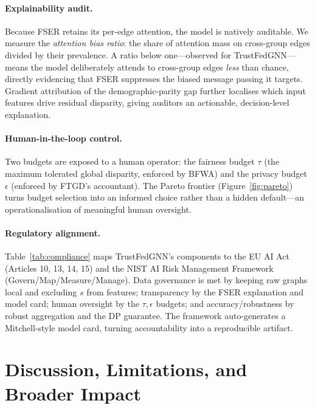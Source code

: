 \documentclass[pdflatex,sn-mathphys-num]{sn-jnl}
\theoremstyle{thmstyleone}%
\theoremstyle{thmstyletwo}%
\theoremstyle{thmstylethree}%
\begin{document}
\paragraph{Explainability audit.}
Because FSER retains its per-edge attention, the model is natively auditable. We
measure the \emph{attention bias ratio}: the share of attention mass on
cross-group edges divided by their prevalence. A ratio below one---observed for
TrustFedGNN---means the model deliberately attends to cross-group edges
\emph{less} than chance, directly evidencing that FSER suppresses the biased
message passing it targets. Gradient attribution of the demographic-parity gap
further localises which input features drive residual disparity, giving auditors
an actionable, decision-level explanation.

\paragraph{Human-in-the-loop control.}
Two budgets are exposed to a human operator: the fairness budget $\tau$ (the
maximum tolerated global disparity, enforced by BFWA) and the privacy budget
$\epsilon$ (enforced by FTGD's accountant). The Pareto frontier
(Figure~\ref{fig:pareto}) turns budget selection into an informed choice rather
than a hidden default---an operationalisation of meaningful human oversight.

\paragraph{Regulatory alignment.}
Table~\ref{tab:compliance} maps TrustFedGNN's components to the EU AI Act
(Articles 10, 13, 14, 15) and the NIST AI Risk Management Framework
(Govern/Map/Measure/Manage). Data governance is met by keeping raw graphs local
and excluding $s$ from features; transparency by the FSER explanation and model
card; human oversight by the $\tau,\epsilon$ budgets; and accuracy/robustness by
robust aggregation and the DP guarantee. The framework auto-generates a
Mitchell-style model card, turning accountability into a reproducible artifact.

\begin{table}[t]\centering\small
\caption{Mapping of TrustFedGNN components to EU AI Act articles and NIST AI RMF
functions.}
\label{tab:compliance}

\end{table}

\section{Discussion, Limitations, and Broader Impact}
\label{sec:discussion}
\end{document}

